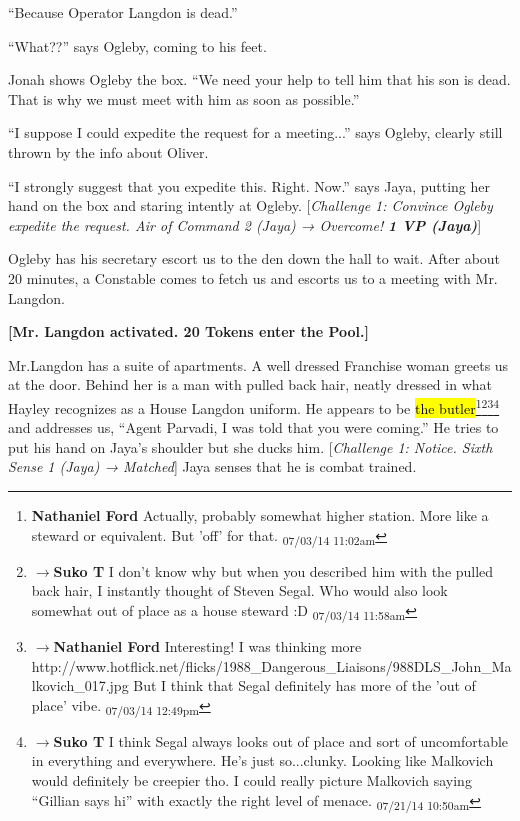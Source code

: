 ``Because Operator Langdon is dead.''

``What??'' says Ogleby, coming to his feet.

Jonah shows Ogleby the box.  ``We need your help to tell him that his son is dead.  That is why we must meet with him as soon as possible.''

``I suppose I could expedite the request for a meeting...'' says Ogleby, clearly still thrown by the info about Oliver.

``I strongly suggest that you expedite this. Right.  Now.'' says Jaya, putting her hand on the box and staring intently at Ogleby. {[}\textit{Challenge 1: Convince Ogleby expedite the request. Air of   Command 2 (Jaya) → Overcome! }\textit{\textbf{1 VP (Jaya)}}{]} 

Ogleby has his secretary escort us to the den down the hall to wait.  After about 20 minutes, a Constable comes to fetch us and escorts us to a meeting with Mr. Langdon.



\textbf{{[}Mr. Langdon activated.  20 Tokens enter the Pool.{]}}



Mr.Langdon has a suite of apartments.  A well dressed Franchise woman greets us at the door.  Behind her is a man with pulled back hair, neatly dressed in what Hayley recognizes as a House Langdon uniform.  He appears to be \hl{the butler}\footnote{\textbf{Nathaniel Ford }Actually, probably somewhat higher station. More like a steward or equivalent. But 'off' for that. \textsubscript{07/03/14 11:02am}}\footnote{$\rightarrow$\textbf{Suko T }I don't know why but when you described him with the pulled back hair, I instantly thought of Steven Segal.  Who would also look somewhat out of place as a house steward :D \textsubscript{07/03/14 11:58am}}\footnote{$\rightarrow$\textbf{Nathaniel Ford }Interesting! I was thinking more http://www.hotflick.net/flicks/1988\_Dangerous\_Liaisons/988DLS\_John\_Malkovich\_017.jpg But I think that Segal definitely has more of the 'out of place' vibe. \textsubscript{07/03/14 12:49pm}}\footnote{$\rightarrow$\textbf{Suko T }I think Segal always looks out of place and sort of uncomfortable in everything and everywhere.  He's just so...clunky.  Looking like Malkovich would definitely be creepier tho.  I could really picture Malkovich saying ``Gillian says hi'' with exactly the right level of menace. \textsubscript{07/21/14 10:50am}} and addresses us, ``Agent Parvadi, I was told that you were coming.''  He tries to put his hand on Jaya's shoulder but she ducks him. {[}\textit{Challenge 1: Notice. Sixth Sense 1 (Jaya) → Matched}{]}  Jaya senses that he is combat trained. 



